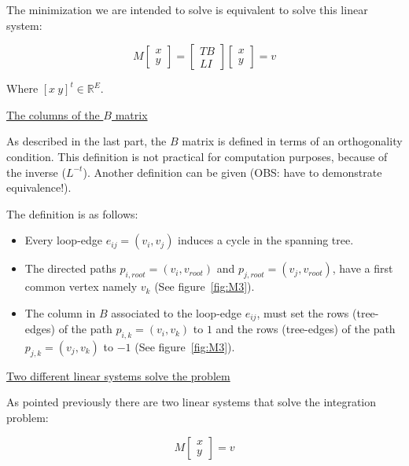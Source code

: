 \documentclass[a4paper,11pt]{article}
\begin{document}
The minimization we are intended to solve is equivalent to solve this 
linear system:

\begin{equation}
     M \begin{bmatrix}
         x \\
         y
	\end{bmatrix}=\begin{bmatrix}
         T B\\
         L I
	\end{bmatrix}
	\begin{bmatrix}
         x \\
         y
	\end{bmatrix} = v
\end{equation}

Where $[x\ y]^t \in \mathbb{R}^E$.

\bigskip

\underline{The columns of the $B$ matrix}

\bigskip

As described in the last part, the $B$ matrix is defined in terms of an 
orthogonality condition. This definition is not practical for 
computation purposes, because of the inverse ($L^{-t}$). Another 
definition can be given (OBS: have to demonstrate equivalence!).

\bigskip

The definition is as follows:

\begin{itemize}
	\item Every loop-edge $e_{ij}=(v_i, v_j)$ induces a cycle in the 
	spanning tree.
	\item The directed paths $p_{i,root}=(v_i, v_{root})$ and $p_{j,root}=(v_j, 
	v_{root})$, have a first common vertex namely $v_k$ (See 
	figure~\ref{fig:M3}).
	\item The column in $B$ associated to the loop-edge $e_{ij}$, must 
	set the rows (tree-edges) of the path $p_{i,k}=(v_i, v_k)$ to $1$ and the rows 
	(tree-edges) of the path $p_{j,k}=(v_j, v_k)$ to $-1$ (See 
	figure~\ref{fig:M3}).
\end{itemize}

\underline{Two different linear systems solve the problem}

\bigskip

As pointed previously there are two linear systems that solve the 
integration problem:

\begin{equation}
     M \begin{bmatrix}
         x \\
         y
	\end{bmatrix}=v
\end{equation}
\end{document}
